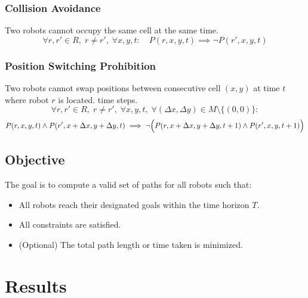 \documentclass[8pt]{article}
\begin{document}
\subsubsection{Collision Avoidance}
Two robots cannot occupy the same cell at the same time.
\[
\forall r,r' \in R,\; r \neq r',\; \forall x,y,t:\quad P(r,x,y,t) \implies \neg P(r',x,y,t)
\]

\subsubsection{Position Switching Prohibition}
Two robots cannot swap positions between consecutive cell $(x,y)$ at time $t$ where robot $r$ is located.
time steps.
\[
\forall r,r' \in R,\; r \neq r',\; \forall x,y,t,\; \forall (\Delta x,\Delta y) \in M \setminus \{(0,0)\}:
\]
\[
P(r,x,y,t) \wedge P(r',x+\Delta x,y+\Delta y,t) \implies \neg \Bigl(P(r,x+\Delta x,y+\Delta y,t+1) \wedge P(r',x,y,t+1)\Bigr)
\]
\subsection{Objective}
The goal is to compute a valid set of paths for all robots such that:
\begin{itemize}
    \item All robots reach their designated goals within the time horizon $T$.
    \item All constraints are satisfied.
    \item (Optional) The total path length or time taken is minimized.
\end{itemize}


\section{Results}
\end{document}
